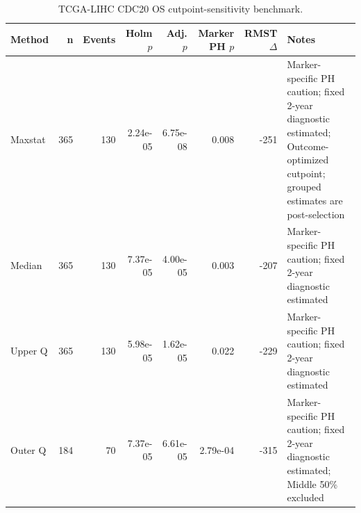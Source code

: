 \begin{table}[t]
\centering
\caption{TCGA-LIHC CDC20 OS cutpoint-sensitivity benchmark.}
\label{tab:lihc-cdc20-os-cutpoints}
\begin{tabular}{lrrrrrrl}
\toprule
Method & n & Events & Holm $p$ & Adj. $p$ & Marker PH $p$ & RMST $\Delta$ & Notes \\
\midrule
Maxstat & 365 & 130 & 2.24e-05 & 6.75e-08 & 0.008 & -251 & Marker-specific PH caution; fixed 2-year diagnostic estimated; Outcome-optimized cutpoint; grouped estimates are post-selection \\
Median & 365 & 130 & 7.37e-05 & 4.00e-05 & 0.003 & -207 & Marker-specific PH caution; fixed 2-year diagnostic estimated \\
Upper Q & 365 & 130 & 5.98e-05 & 1.62e-05 & 0.022 & -229 & Marker-specific PH caution; fixed 2-year diagnostic estimated \\
Outer Q & 184 & 70 & 7.37e-05 & 6.61e-05 & 2.79e-04 & -315 & Marker-specific PH caution; fixed 2-year diagnostic estimated; Middle 50\% excluded \\
\bottomrule
\end{tabular}
\end{table}
